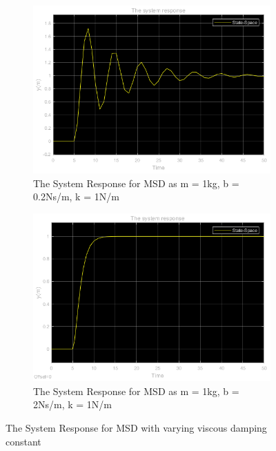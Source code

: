 \documentclass[a4paper,12pt]{article}
\begin{document}
\begin{enumerate}
\begin{enumerate}
\begin{enumerate}
			
				\begin{figure}[H]
					\setlength{\unitlength}{\textwidth} 
					\centering
					\begin{subfigure}{.5\textwidth}
  						\centering
  						\includegraphics[width=0.495\unitlength]{images/1cey}
  						\caption{\label{fig:1c3a} The System Response for MSD as m = 1kg, b = 0.2Ns/m, k = 1N/m }
					\end{subfigure}%
					\begin{subfigure}{.5\textwidth}
  						\centering
						\includegraphics[width=0.495\unitlength]{images/1c3ey}
  						\caption{\label{fig:1c3} The System Response for MSD as m = 1kg, b = 2Ns/m, k = 1N/m }
					\end{subfigure}
					\caption{\label{fig:varyingb} The System Response for MSD with varying viscous damping constant   }
				\end{figure}
			

\end{enumerate}
\end{enumerate}
\end{enumerate}
\end{document}
